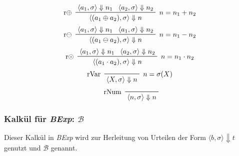 			    \begin{multicols}{2}
				    \begin{equation*}
					    \prftree[l, r]
						    { $ n = n _ 1 + n _ 2 $ }
						    { r$ \oplus $ }
						    { \langle a _ 1, \sigma \rangle \Downarrow n _ 1 }
						    { \langle a _ 2, \sigma \rangle \Downarrow n _ 2 }
						    { \langle (a _ 1 \oplus a _ 2), \sigma \rangle \Downarrow n }
				    \end{equation*}
				    \begin{equation*}
						\prftree[l, r]
							{ $ n = n _ 1 - n _ 2 $ }
							{ r$ \ominus $ }
							{ \langle a _ 1, \sigma \rangle \Downarrow n _ 1 }
							{ \langle a _ 1, \sigma \rangle \Downarrow n _ 2 }
							{ \langle (a _ 1 \ominus a _ 2), \sigma \rangle \Downarrow n }
				    \end{equation*}
				    \begin{equation*}
					    \prftree[l, r]
						    { $ n = n _ 1 \cdot n _ 2 $ }
						    { r$ \odot $ }
						    { \langle a _ 1, \sigma \rangle \Downarrow n _ 1 }
						    { \langle a _ 2, \sigma \rangle \Downarrow n _ 2 }
						    { \langle (a _ 1 \cdot a _ 2), \sigma \rangle \Downarrow n }
				    \end{equation*}
				    \begin{equation*}
					    \prftree[l, r]
						    { $ n  = \sigma(X) $ }
						    { rVar }
						    { \langle X, \sigma \rangle \Downarrow n }
				    \end{equation*}
				    \begin{equation*}
					    \prftree[l]
						    { rNum }
						    { \langle n, \sigma \rangle \Downarrow n }
				    \end{equation*}
			    \end{multicols}
		    
		    \subsubsection{Kalkül für \textit{BExp}: $ \mathcal{B} $}
			    Dieser Kalkül in \textit{BExp} wird zur Herleitung von Urteilen der Form $ \langle b, \sigma \rangle \Downarrow t $ genutzt und $ \mathcal{B} $ genannt.
		    
